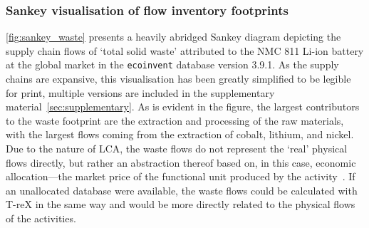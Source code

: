 \documentclass[a4paper,fleqn]{cas-dc}
\begin{document}
\subsubsection{Sankey visualisation of flow inventory footprints}\label{sec:results-case_study-sankey}

\autoref{fig:sankey_waste} presents a heavily abridged Sankey diagram depicting the supply chain flows of `total solid waste' attributed to the NMC 811 Li-ion battery at the global market in the \texttt{ecoinvent} database version 3.9.1. As the supply chains are expansive, this visualisation has been greatly simplified to be legible for print, multiple versions are included in the supplementary material~\autoref{sec:supplementary}. As is evident in the figure, the largest contributors to the waste footprint are the extraction and processing of the raw materials, with the largest flows coming from the extraction of cobalt, lithium, and nickel. Due to the nature of LCA, the waste flows do not represent the `real' physical flows directly, but rather an abstraction thereof based on, in this case, economic allocation---the market price of the functional unit produced by the activity~\citep{guinee2004economicallocation}. If an unallocated database were available, the waste flows could be calculated with T-reX in the same way and would be more directly related to the physical flows of the activities.
\end{document}
